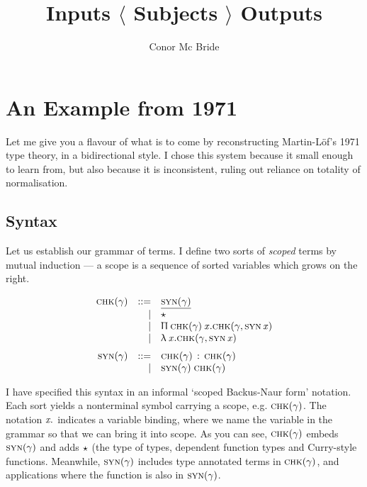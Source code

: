 \documentclass[format=acmsmall, screen, review, anonymous, timestamp]{acmart}
\newcommand{\V}[1]{\purple{\mathit{#1}}}
\newcommand{\ra}[2]{#1 \,:\, #2}
\newcommand{\Ne}{\underline}
\newcommand{\PI}{\blue{\Uppi}}
\newcommand{\x}[1]{\V{x_{\mathrm{#1}}}}
\newcommand{\Ty}{\blue{\star}}
\begin{document}
\title{Inputs $\langle$ Subjects $\rangle$ Outputs}
\author{Conor Mc Bride}
\maketitle

\section{An Example from 1971}

Let me give you a flavour of what is to come by reconstructing Martin-L\"of's 1971 type theory, in a bidirectional style. I chose this system because it small enough to learn from, but also because it is inconsistent, ruling out reliance on totality of normalisation.


\subsection{Syntax}

Let us establish our grammar of terms. I define two sorts of \emph{scoped} terms by mutual induction --- a scope is a sequence of sorted variables which grows on the right.
\newcommand{\syso}{\textsc}
\newcommand{\chk}[1]{\syso{chk}(#1)}
\newcommand{\syn}[1]{\syso{syn}(#1)}
\newcommand{\bva}[2]{\syso{#1}\,{\V{#2}}}
\newcommand{\PT}[3]{\PI\:#1\:\V{#2}.#3}
\newcommand{\LA}{\red{\uplambda}}
\newcommand{\LF}[2]{\LA\:\V{#1}.#2}

\[\begin{array}{rrl}
    \chk\gamma & ::= & \Ne{\syn\gamma} \\
               &   | & \Ty \\
               &   | & \PT {\chk\gamma}x{\chk{\gamma,\bva{syn}x}}\\
               &   | & \LF x{\chk{\gamma,\bva{syn}x}}
                       \medskip\\
    \syn\gamma & ::= & \ra{\chk\gamma}{\chk\gamma}\\
               &   | & \syn\gamma\;\chk\gamma
\end{array}\]

I have specified this syntax in an informal `scoped Backus-Naur form' notation. Each sort yields a nonterminal symbol carrying a scope, e.g. $\chk\gamma$. The notation ${\x{}.}$ indicates a variable binding, where we name the variable in the grammar so that we can bring it into scope. As you can see, $\chk\gamma$ embeds $\syn\gamma$ and adds $\Ty$ (the type of types, dependent function types and Curry-style functions. Meanwhile, $\syn\gamma$ includes type annotated terms in $\chk\gamma$, and applications where the function is also in $\syn\gamma$.
\end{document}

